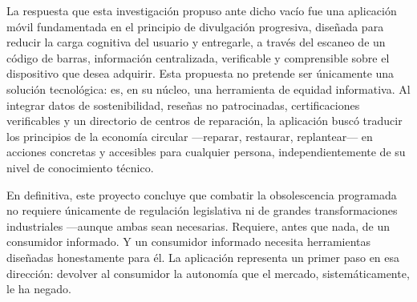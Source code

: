La respuesta que esta investigación propuso ante dicho vacío fue una aplicación
móvil fundamentada en el principio de divulgación progresiva, diseñada para
reducir la carga cognitiva del usuario y entregarle, a través del escaneo de un
código de barras, información centralizada, verificable y comprensible sobre el
dispositivo que desea adquirir. Esta propuesta no pretende ser únicamente una
solución tecnológica: es, en su núcleo, una herramienta de equidad informativa.
Al integrar datos de sostenibilidad, reseñas no patrocinadas, certificaciones
verificables y un directorio de centros de reparación, la aplicación buscó
traducir los principios de la economía circular —reparar, restaurar, replantear—
en acciones concretas y accesibles para cualquier persona, independientemente de
su nivel de conocimiento técnico. 

En definitiva, este proyecto concluye que combatir la obsolescencia programada
no requiere únicamente de regulación legislativa ni de grandes transformaciones
industriales —aunque ambas sean necesarias. Requiere, antes que nada, de un
consumidor informado. Y un consumidor informado necesita herramientas diseñadas
honestamente para él. La aplicación representa un primer paso en esa
dirección: devolver al consumidor la autonomía que el mercado, sistemáticamente,
le ha negado. 

